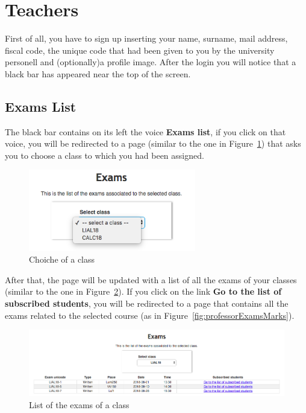\newpage
\section{Teachers}
First of all, you have to sign up inserting your name, surname, mail address, fiscal code, the unique code that had been given to you by the university personell and (optionally)a profile image.
After the login you will notice that a black bar has appeared near the top of the screen. 

\subsection{Exams List}
The black bar contains on its left the voice \textbf{Exams list}, if you click on that voice, you will be redirected to a page (similar to the one in Figure~\ref{fig:professorChooseExam}) that asks you to choose a class to which you had been assigned.
\begin{figure}[H]
	\centering
	\includegraphics[width=0.65\textwidth]{img/professorChooseExam.png}
	\caption{Choiche of a class}
	\label{fig:professorChooseExam}
\end{figure}

After that, the page will be updated with a list of all the exams of your classes (similar to the one in Figure~\ref{fig:professorExamsList}). If you click on the link \textbf{Go to the list of subscribed students}, you will be redirected to a page that contains all the exams related to the selected course (as in Figure~\ref{fig:professorExamsMarks}).
\begin{figure}[H]
\centering
\includegraphics[width=1.0\textwidth]{img/professorExamsList.png}
\caption{List of the exams of a class}
\label{fig:professorExamsList}
\end{figure}

